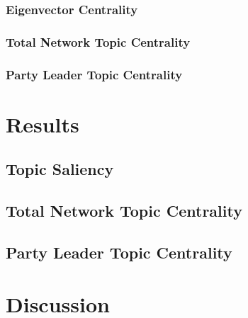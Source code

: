 \documentclass{nws}
\begin{document}
\subsubsection{Eigenvector Centrality}

\subsubsection{Total Network Topic Centrality}

\subsubsection{Party Leader Topic Centrality}

\section{Results}

\subsection{Topic Saliency}

\subsection{Total Network Topic Centrality}

\subsection{Party Leader Topic Centrality}

\section{Discussion}





\label{lastpage}
\end{document}
